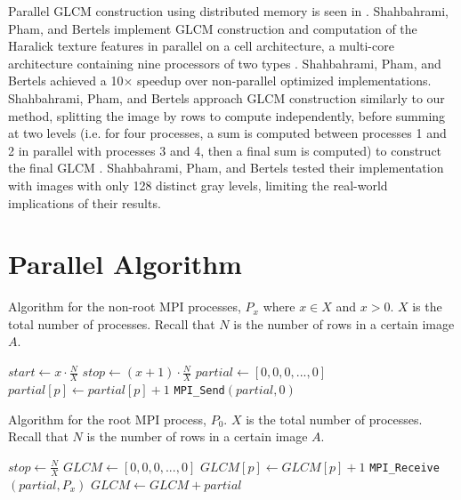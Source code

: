 \documentclass{article}
\begin{document}
   Parallel GLCM construction using distributed memory is seen in \cite{shahbahrami}. Shahbahrami, Pham, and Bertels implement GLCM construction and computation of the Haralick texture features in parallel on a cell architecture, a multi-core architecture containing nine processors of two types \cite{shahbahrami}.  Shahbahrami, Pham, and Bertels achieved a 10$\times$ speedup over non-parallel optimized implementations. Shahbahrami, Pham, and Bertels approach GLCM construction similarly to our method, splitting the image by rows to compute independently, before summing at two levels (i.e. for four processes, a sum is computed between processes 1 and 2 in parallel with processes 3 and 4, then a final sum is computed) to construct the final GLCM \cite{shahbahrami}. Shahbahrami, Pham, and Bertels tested their implementation with images with only 128 distinct gray levels, limiting the real-world implications of their results. 
\section{Parallel Algorithm}
\begin{algorithm}
    \caption{Algorithm for the non-root MPI processes, $P_x$ where $x \in X$ and $x > 0$. $X$ is the total number of processes. Recall that $N$ is the number of rows in a certain image $A$. }\label{alg:1}
    \begin{algorithmic}
        \State $start \gets x \cdot \frac{N}{X}$
        \State $stop \gets (x + 1) \cdot \frac{N}{X}$
        \State $partial \gets [0, 0, 0, ..., 0]$
            \State $partial[p] \gets partial[p] + 1$
        \EndIf
        \EndWhile
        \State \texttt{MPI\_Send}$(partial, 0)$
    \end{algorithmic}
\end{algorithm}

\begin{algorithm}
    \caption{Algorithm for the root MPI process, $P_0$. $X$ is the total number of processes. Recall that $N$ is the number of rows in a certain image $A$. }\label{alg:2}
    \begin{algorithmic}
        \State $stop \gets \frac{N}{X}$
        \State $GLCM \gets [0, 0, 0, ..., 0]$
            \State $GLCM[p] \gets GLCM[p] + 1$
        \EndIf
        \EndWhile
            \State \texttt{MPI\_Receive}$(partial, P_x)$
            \State $GLCM \gets GLCM + partial$
        \EndFor
    \end{algorithmic}
\end{algorithm}
\end{document}
